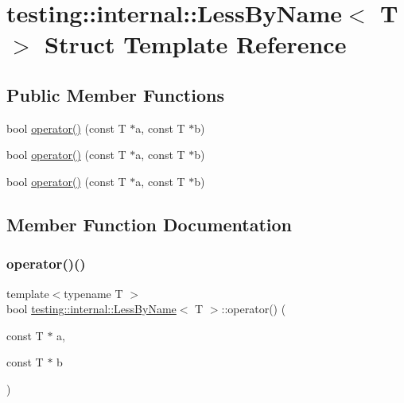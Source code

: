 \hypertarget{structtesting_1_1internal_1_1_less_by_name}{}\section{testing\+::internal\+::Less\+By\+Name$<$ T $>$ Struct Template Reference}
\label{structtesting_1_1internal_1_1_less_by_name}
\subsection*{Public Member Functions}
\begin{DoxyCompactItemize}
\item 
bool \mbox{\hyperlink{structtesting_1_1internal_1_1_less_by_name_a62386ac7750bfc035536be55d90a52eb}{operator()}} (const T $\ast$a, const T $\ast$b)
\item 
bool \mbox{\hyperlink{structtesting_1_1internal_1_1_less_by_name_a62386ac7750bfc035536be55d90a52eb}{operator()}} (const T $\ast$a, const T $\ast$b)
\item 
bool \mbox{\hyperlink{structtesting_1_1internal_1_1_less_by_name_a62386ac7750bfc035536be55d90a52eb}{operator()}} (const T $\ast$a, const T $\ast$b)
\end{DoxyCompactItemize}


\subsection{Member Function Documentation}
\mbox{\label{structtesting_1_1internal_1_1_less_by_name_a62386ac7750bfc035536be55d90a52eb}} 
\subsubsection{\texorpdfstring{operator()()}{operator()()}\hspace{0.1cm}{\footnotesize\ttfamily [1/3]}}
{\footnotesize\ttfamily template$<$typename T $>$ \\
bool \mbox{\hyperlink{structtesting_1_1internal_1_1_less_by_name}{testing\+::internal\+::\+Less\+By\+Name}}$<$ T $>$\+::operator() (\begin{DoxyParamCaption}\item[{const T $\ast$}]{a,  }\item[{const T $\ast$}]{b }\end{DoxyParamCaption})\hspace{0.3cm}{\ttfamily [inline]}}

